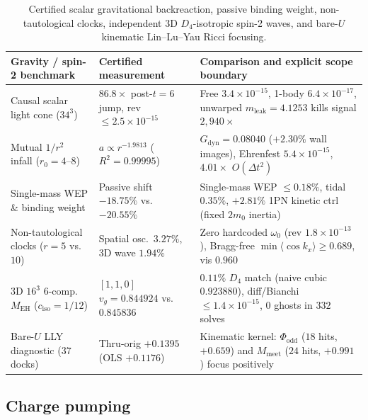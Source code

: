 \begin{table}[tb]
\centering
\caption{Certified scalar gravitational backreaction, passive binding weight, non-tautological clocks, independent 3D
$D_4$-isotropic spin-2 waves, and bare-$U$ kinematic Lin--Lu--Yau Ricci focusing.}
\label{tab:gravity-spin2}
\footnotesize
\begin{tabularx}{\textwidth}{@{}>{\raggedright\arraybackslash}p{4.00cm}>{\raggedright\arraybackslash}p{3.55cm}>{\raggedright\arraybackslash}X@{}}
\toprule
Gravity / spin-2 benchmark & Certified measurement & Comparison and explicit scope boundary \\
\midrule
Causal scalar light cone ($34^3$) & $86.8\times$ post-$t{=}6$ jump, rev $\le 2.5 \times 10^{-15}$ & Free $3.4 \times 10^{-15}$, 1-body $6.4 \times 10^{-17}$, unwarped $m_{\mathrm{leak}} = 4.1253$ kills signal $2{,}940\times$ \\
Mutual $1/r^2$ infall ($r_0 = 4\text{--}8$) & $a \propto r^{-1.9813}$ ($R^2 = 0.99995$) & $G_{\mathrm{dyn}} = 0.08040$ ($+2.30\%$ wall images), Ehrenfest $5.4 \times 10^{-15}$, $4.01\times$ $O(\Delta t^2)$ \\
Single-mass WEP \& binding weight & Passive shift $\mathbf{-18.75\%}$ vs.\ $\mathbf{-20.55\%}$ & Single-mass WEP $\le 0.18\%$, tidal $0.35\%$, $+2.81\%$ 1PN kinetic ctrl (fixed $2m_0$ inertia) \\
Non-tautological clocks ($r = 5$ vs.\ $10$) & Spatial osc.\ $\mathbf{3.27\%}$, 3D wave $\mathbf{1.94\%}$ & Zero hardcoded $\omega_0$ (rev $1.8 \times 10^{-13}$), Bragg-free $\min\langle\cos k_x\rangle \ge 0.689$, vis $0.960$ \\
3D $16^3$ 6-comp.\ $M_{\mathrm{EH}}$ ($c_{\mathrm{iso}} = 1/12$) & $[1,1,0]$ $v_g = \mathbf{0.844924}$ vs.\ $0.845836$ & $\mathbf{0.11\%}$ $D_4$ match (naive cubic $0.923880$), diff/Bianchi $\le 1.4 \times 10^{-15}$, $0$ ghosts in $332$ solves \\
Bare-$U$ LLY diagnostic ($37$ docks) & Thru-orig $+0.1395$ (OLS $+0.1176$) & Kinematic kernel: $\Phi_{\mathrm{odd}}$ ($18$ hits, $+0.659$) and $M_{\mathrm{meet}}$ ($24$ hits, $+0.991$) focus positively \\
\bottomrule
\end{tabularx}
\end{table}

\subsection{Charge pumping}

